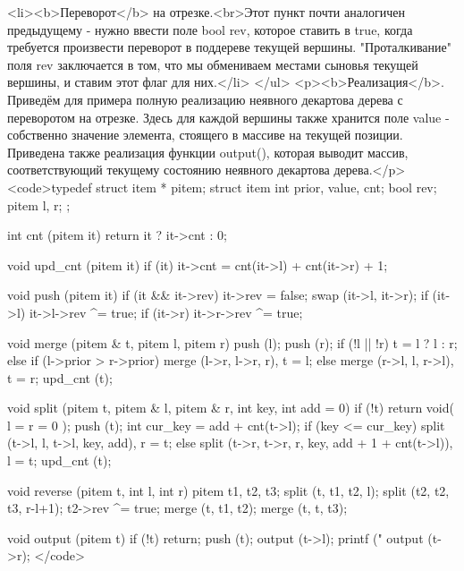 <li><b>Переворот</b> на отрезке.<br>Этот пункт почти аналогичен предыдущему - нужно ввести поле bool rev, которое ставить в true, когда требуется произвести переворот в поддереве текущей вершины. "Проталкивание" поля rev заключается в том, что мы обмениваем местами сыновья текущей вершины, и ставим этот флаг для них.</li>
</ul>
<p><b>Реализация</b>. Приведём для примера полную реализацию неявного декартова дерева с переворотом на отрезке. Здесь для каждой вершины также хранится поле value - собственно значение элемента, стоящего в массиве на текущей позиции. Приведена также реализация функции output(), которая выводит массив, соответствующий текущему состоянию неявного декартова дерева.</p>
<code>typedef struct item * pitem;
struct item {
	int prior, value, cnt;
	bool rev;
	pitem l, r;
};

int cnt (pitem it) {
	return it ? it->cnt : 0;
}

void upd_cnt (pitem it) {
	if (it)
		it->cnt = cnt(it->l) + cnt(it->r) + 1;
}

void push (pitem it) {
	if (it && it->rev) {
		it->rev = false;
		swap (it->l, it->r);
		if (it->l)  it->l->rev ^= true;
		if (it->r)  it->r->rev ^= true;
	}
}

void merge (pitem & t, pitem l, pitem r) {
	push (l);
	push (r);
	if (!l || !r)
		t = l ? l : r;
	else if (l->prior > r->prior)
		merge (l->r, l->r, r),  t = l;
	else
		merge (r->l, l, r->l),  t = r;
	upd_cnt (t);
}

void split (pitem t, pitem & l, pitem & r, int key, int add = 0) {
	if (!t)
		return void( l = r = 0 );
	push (t);
	int cur_key = add + cnt(t->l);
	if (key <= cur_key)
		split (t->l, l, t->l, key, add),  r = t;
	else
		split (t->r, t->r, r, key, add + 1 + cnt(t->l)),  l = t;
	upd_cnt (t);
}

void reverse (pitem t, int l, int r) {
	pitem t1, t2, t3;
	split (t, t1, t2, l);
	split (t2, t2, t3, r-l+1);
	t2->rev ^= true;
	merge (t, t1, t2);
	merge (t, t, t3);
}

void output (pitem t) {
	if (!t)  return;
	push (t);
	output (t->l);
	printf ("%
	output (t->r);
}</code>